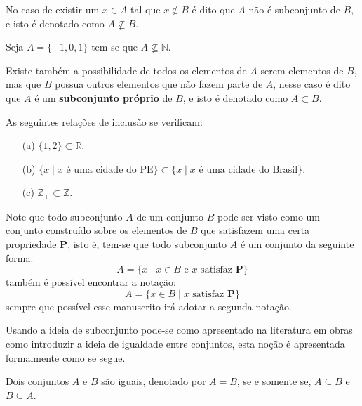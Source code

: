 No caso de existir um $x \in A$ tal que $x \notin B$ é dito que $A$ não é subconjunto de $B$, e isto é denotado como $A \not\subseteq B$. 

\begin{exem}\label{exe:NaoInclusao}
	Seja $A = \{-1, 0, 1\}$ tem-se que $A \not\subseteq \mathbb{N}$.
\end{exem}

Existe também a possibilidade de todos os elementos de $A$ serem elementos de $B$, mas que $B$ possua outros elementos que não fazem parte de $A$, nesse caso é dito que $A$ é um \textbf{subconjunto próprio} de $B$, e isto é denotado como $A \subset B$. 

\begin{exem}\label{exe:InclusaoPropria}
	As seguintes relações de inclusão se verificam:
	\begin{itemize}
		\item[(a)] $\{1, 2\} \subset \mathbb{R}$.
		\item[(b)] $\{x \mid x \mbox{ é uma cidade do PE}\} \subset \{x \mid x \mbox{ é uma cidade do Brasil}\}$.
		\item[(c)] $\mathbb{Z}_+ \subset \mathbb{Z}$.
	\end{itemize}
\end{exem}

\begin{rema}
	Note que todo subconjunto $A$ de um conjunto $B$ pode ser visto como um conjunto construído sobre os elementos de $B$ que satisfazem uma certa propriedade $\textbf{P}$, isto é, tem-se que todo subconjunto $A$ é um conjunto da seguinte forma:
	$$A = \{x \mid x \in B \mbox{ e } x \mbox{ satisfaz } \textbf{P}\}$$
	também é possível encontrar a notação:
	$$A = \{x \in B  \mid x \mbox{ satisfaz } \textbf{P}\}$$
	sempre que possível esse manuscrito irá adotar a segunda notação.
\end{rema}

Usando a ideia de subconjunto pode-se como apresentado na literatura em obras como \cite{abe1991-TC, halmos2001, lipschutz1978-TC} introduzir a ideia de igualdade entre conjuntos, esta noção é apresentada formalmente como se segue.


\begin{definition}\label{def:IgualdadeConjuntos}
	\cite{abe1991-TC} Dois conjuntos $A$ e $B$ são iguais, denotado por $A = B$, se e somente se, $A \subseteq B$ e $B \subseteq A$.
\end{definition}

